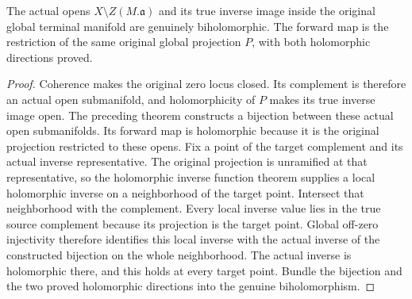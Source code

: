 \begin{theorem}
\label{hir:original-global-terminal-genuine-off-zero-biholomorphism}
\leanok
{}
The actual opens $X\setminus Z(M.\mathfrak a)$ and its true inverse image
inside the original global terminal manifold are genuinely biholomorphic.
The forward map is the restriction of the same original global projection
$P$, with both holomorphic directions proved.
\end{theorem}
\begin{proof}
Coherence makes the original zero locus closed.  Its complement is
therefore an actual open submanifold, and holomorphicity of $P$ makes
its true inverse image open.  The preceding theorem constructs a
bijection between these actual open submanifolds.  Its forward map is
holomorphic because it is the original projection restricted to these
opens.  Fix a point of the target complement and its actual inverse
representative.  The original projection is unramified at that
representative, so the holomorphic inverse function theorem supplies
a local holomorphic inverse on a neighborhood of the target point.
Intersect that neighborhood with the complement.  Every local inverse
value lies in the true source complement because its projection is the
target point.  Global off-zero injectivity therefore identifies this
local inverse with the actual inverse of the constructed bijection on
the whole neighborhood.  The actual inverse is holomorphic there, and
this holds at every target point.  Bundle the bijection and the two
proved holomorphic directions into the genuine biholomorphism.
\end{proof}
